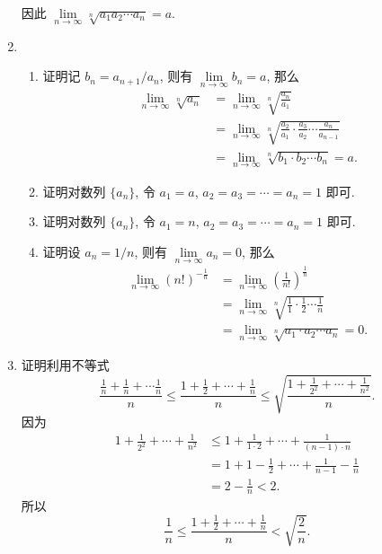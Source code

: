 \begin{enumerate}
        因此 $\lim\limits_{n\to\infty}\sqrt[n]{a_1a_2\cdots a_n} = a$.
    \item
        \begin{enumerate}[(1)]
            \item 
                {\heiti 证明}\quad 记 $b_n = a_{n+1}/a_n$, 则有 $\lim\limits_{n\to\infty}b_n = a$, 那么
                \begin{align*}
                    \lim_{n\to\infty}\sqrt[n]{a_n} &= \lim_{n\to\infty}\sqrt[n]{\frac{a_n}{a_1}} \\
                                                   &= \lim_{n\to\infty}\sqrt[n]{\frac{a_2}{a_1} \cdot \frac{a_3}{a_2} \cdots \frac{a_n}{a_{n-1}}} \\
                                                   &= \lim_{n\to\infty}\sqrt[n]{b_1 \cdot b_2 \cdots b_n} = a.
                \end{align*}
            \item 
                {\heiti 证明}\quad 对数列 $\{a_n\}$, 令 $a_1 = a$, $a_2 = a_3 = \cdots = a_n = 1$ 即可.
            \item 
                {\heiti 证明}\quad 对数列 $\{a_n\}$, 令 $a_1 = n$, $a_2 = a_3 = \cdots = a_n = 1$ 即可.
            \item 
                {\heiti 证明}\quad 设 $a_n = 1/n$, 则有 $\lim\limits_{n\to\infty}a_n = 0$, 那么
                \begin{align*}
                    \lim_{n\to\infty}(n!)^{-\frac{1}{n}} &= \lim_{n\to\infty}\left(\frac{1}{n!}\right)^\frac{1}{n} \\
                                                         &= \lim_{n\to\infty}\sqrt[n]{\frac{1}{1} \cdot \frac{1}{2} \cdots \frac{1}{n}} \\
                                                         &= \lim_{n\to\infty}\sqrt[n]{a_1 \cdot a_2 \cdots a_n} = 0.
                \end{align*}
        \end{enumerate}
    \item
        {\heiti 证明}\quad 利用不等式
        \[
            \frac{\frac 1n + \frac 1n + \cdots \frac 1n}{n} \leqslant \frac{1 + \frac 12 + \cdots + \frac 1n}{n} \leqslant \sqrt{\frac{1 + \frac{1}{2^2} + \cdots + \frac{1}{n^2}}{n}}.    
        \]
        因为
        \begin{align*}
            1 + \frac{1}{2^2} + \cdots + \frac{1}{n^2} &\leqslant 1 + \frac{1}{1 \cdot 2} + \cdots + \frac{1}{(n-1) \cdot n} \\
            &= 1 + 1 - \frac 12 + \cdots + \frac{1}{n - 1} - \frac 1n \\
            &= 2 - \frac 1n < 2.
        \end{align*}
        所以
        \[
            \frac 1n \leqslant \frac{1 + \frac 12 + \cdots + \frac 1n}{n} < \sqrt{\frac 2n}.
        \]


\end{enumerate}
